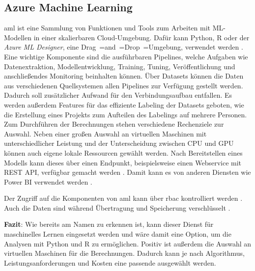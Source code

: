 \subsection{Azure Machine Learning} \label{sec:grundlagen:azure_dienste:machineLearning}
\ac{aml} ist eine Sammlung von Funktionen und Tools zum Arbeiten mit ML-Modellen in einer skalierbaren Cloud-Umgebung. Dafür kann Python, R oder der \textit{Azure ML Designer}, eine Drag~=and~=Drop~=Umgebung, verwendet werden \cite{soh_data_2020}. Eine wichtige Komponente sind die ausführbaren Pipelines, welche Aufgaben wie Datenextraktion, Modellentwicklung, Training, Tuning, Veröffentlichung und anschließendes Monitoring beinhalten können. Über Datasets können die Daten aus verschiedenen Quellsystemen allen Pipelines zur Verfügung gestellt werden. Dadurch soll zusätzlicher Aufwand für den Verbindungsaufbau entfallen. Es werden außerdem Features für das effiziente Labeling der Datasets geboten, wie die Erstellung eines Projekts zum Aufteilen des Labelings auf mehrere Personen. Zum Durchführen der Berechnungen stehen verschiedene Rechenziele zur Auswahl. Neben einer großen Auswahl an virtuellen Maschinen mit unterschiedlicher Leistung und der Unterscheidung zwischen CPU und GPU können auch eigene lokale Ressourcen gewählt werden. Nach Bereitstellen eines Modells kann dieses über einen Endpunkt, beispielsweise einen Webservice mit REST API, verfügbar gemacht werden \cite{price_azure_2021}. Damit kann es von anderen Diensten wie Power BI verwendet werden \cite{msdoc_21_aml_consumeModel}.

Der Zugriff auf die Komponenten von \ac{aml} kann über \ac{rbac} kontrolliert werden \cite{msdoc_21_aml_roles}. Auch die Daten sind während Übertragung und Speicherung verschlüsselt \cite{msdoc_21_aml_dataEncryption}.

\textbf{Fazit}: Wie bereits am Namen zu erkennen ist, kann dieser Dienst für maschinelles Lernen eingesetzt werden und wäre damit eine Option, um die Analysen mit Python und R zu ermöglichen. Positiv ist außerdem die Auswahl an virtuellen Maschinen für die Berechnungen. Dadurch kann je nach Algorithmus, Leistungsanforderungen und Kosten eine passende ausgewählt werden.


